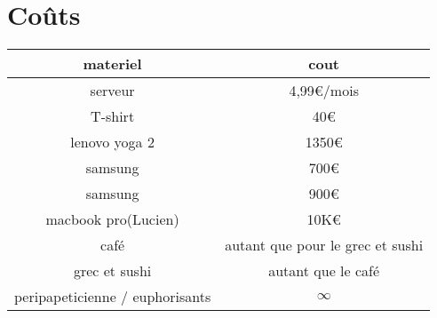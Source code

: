 \chapter{Coûts}
\begin{tabular}{|c|c|}
    \hline
    materiel & cout\\ \hline \hline
    serveur & 4,99\euro/mois\\ \hline
    T-shirt & 40\euro \\ \hline
    lenovo yoga 2 & 1350\euro \\ \hline
    samsung & 700\euro \\ \hline
    samsung & 900\euro \\ \hline 
    macbook pro(Lucien) & 10K\euro \\ \hline
    café & autant que pour le grec et sushi \\ \hline
    grec et sushi & autant que le café \\ \hline
    peripapeticienne / euphorisants & $\infty$ \\ \hline
\end{tabular}
